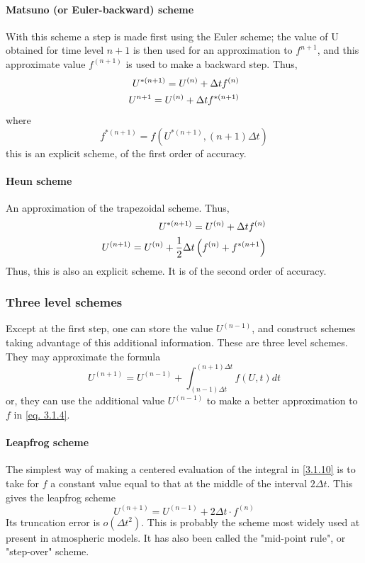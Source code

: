 \paragraph{Matsuno (or Euler-backward) scheme}
With this scheme a step is made first using the Euler scheme; the value of U obtained for time level $n+1$ is then used for an approximation to $f^{n+1}$, and this approximate value $f^{(n+1)}$ is used to make a backward step. Thus,
\begin{align}\label{3.1.8}
	U^{*(n+1)}=U^{(n)}+\Delta tf^{(n)} \\
	U^{n+1}=U^{(n)}+\Delta  tf^{*(n+1)}\notag
\end{align}
where
$$f^{*(n+1)}=f\left(U^{*(n+1)}, (n+1)\Delta t\right)$$
this is an explicit scheme, of the first order of accuracy.
\paragraph{Heun scheme}
An approximation of the trapezoidal scheme. Thus,
\begin{align}
	U^{*(n+1)}=U^{(n)}+\Delta t f^{(n)} \\
	U^{(n+1)}=U^{(n)}+\frac{1}{2}\Delta t \left(f^{(n)}+f^{*(n+1}\right) \notag
\end{align}
Thus, this is also an explicit scheme. It is of the second order of accuracy.
\subsubsection{Three level schemes}
Except at the first step, one can store the value $U^{(n-1)}$, and construct schemes taking advantage of this additional information. These are three level schemes. They may approximate the formula
\begin{equation}\label{3.1.10}
	U^{(n+1)}=U^{(n-1)}+\int_{(n-1)\Delta t}^{(n+1)\Delta t}f(U,t)dt
\end{equation}
or, they can use the additional value $U^{(n-1)}$ to make a better approximation to $f$ in \ref{eq. 3.1.4}.
\paragraph{Leapfrog scheme}
The simplest way of making a centered evaluation of the integral in \ref{3.1.10} is to take for $f$ a constant value equal to that at the middle of the interval $2\Delta t$. This gives the leapfrog scheme
\begin{equation}\label{3.1.11}
	U^{(n+1)}=U^{(n-1)}+2\Delta t\cdot f^{(n)}
\end{equation}
Its truncation error is $o(\Delta t^2)$. This is probably the scheme most widely used at present in atmospheric models. It has also been called the "mid-point rule", or "step-over" scheme.
